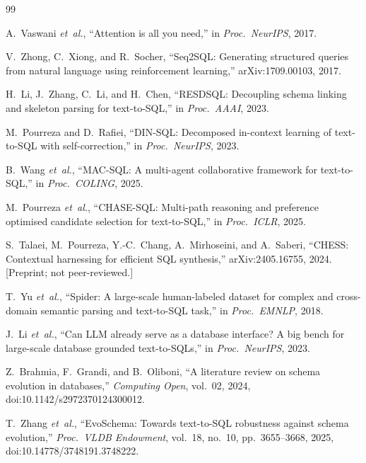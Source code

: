 \documentclass[conference,10pt,a4paper]{IEEEtran}
\begin{document}
\begin{thebibliography}{99}

A.~Vaswani \textit{et~al.}, ``Attention is all you need,'' in
\emph{Proc.\ NeurIPS}, 2017.

V.~Zhong, C.~Xiong, and R.~Socher, ``Seq2SQL: Generating structured queries
from natural language using reinforcement learning,'' arXiv:1709.00103,
2017.

H.~Li, J.~Zhang, C.~Li, and H.~Chen, ``RESDSQL: Decoupling schema linking
and skeleton parsing for text-to-SQL,'' in \emph{Proc.\ AAAI}, 2023.

M.~Pourreza and D.~Rafiei, ``DIN-SQL: Decomposed in-context learning of
text-to-SQL with self-correction,'' in \emph{Proc.\ NeurIPS}, 2023.

B.~Wang \textit{et~al.}, ``MAC-SQL: A multi-agent collaborative framework
for text-to-SQL,'' in \emph{Proc.\ COLING}, 2025.

M.~Pourreza \textit{et~al.}, ``CHASE-SQL: Multi-path reasoning and
preference optimised candidate selection for text-to-SQL,'' in
\emph{Proc.\ ICLR}, 2025.

S.~Talaei, M.~Pourreza, Y.-C.~Chang, A.~Mirhoseini, and A.~Saberi,
``CHESS: Contextual harnessing for efficient SQL synthesis,''
arXiv:2405.16755, 2024. [Preprint; not peer-reviewed.]

T.~Yu \textit{et~al.}, ``Spider: A large-scale human-labeled dataset for
complex and cross-domain semantic parsing and text-to-SQL task,'' in
\emph{Proc.\ EMNLP}, 2018.

J.~Li \textit{et~al.}, ``Can LLM already serve as a database interface? A
big bench for large-scale database grounded text-to-SQLs,'' in
\emph{Proc.\ NeurIPS}, 2023.

Z.~Brahmia, F.~Grandi, and B.~Oliboni, ``A literature review on schema
evolution in databases,'' \emph{Computing Open}, vol.~02, 2024,
doi:10.1142/s2972370124300012.

T.~Zhang \textit{et~al.}, ``EvoSchema: Towards text-to-SQL robustness
against schema evolution,'' \emph{Proc.\ VLDB Endowment}, vol.~18, no.~10,
pp.~3655--3668, 2025, doi:10.14778/3748191.3748222.


\end{thebibliography}
\end{document}
